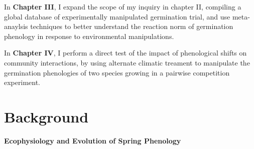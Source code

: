 \documentclass{article}\usepackage[]{graphicx}\usepackage[]{color}
\begin{document}
\par In \textbf{Chapter III}, I expand the scope of my inquiry in chapter II, compiling a global database of experimentally manipulated germination trial, and use meta-anaylsis techniques to better understand the reaction norm of germination phenology in response to environmental manipulations.
\par In \textbf{Chapter IV}, I perform a direct test of the impact of phenological shifts on community interactions, by using alternate climatic treament to manipulate the germination phenologies of two species growing in a pairwise competition experiment.

\section*{Background}
\textbf{Ecophysiology and Evolution of Spring Phenology}
\end{document}

